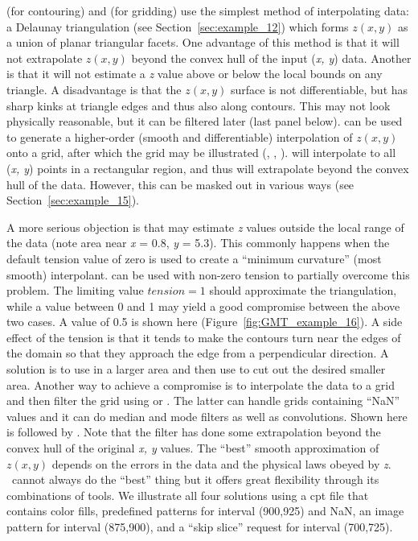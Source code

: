  (for contouring) and 
(for gridding) use the simplest method of interpolating
data:  a Delaunay triangulation (see Section~\ref{sec:example_12}) which
forms $z(x, y)$ as a union of planar triangular facets.
One advantage of this method is that it will not extrapolate
$z(x, y)$ beyond the convex hull of the input ({\it x, y})
data.  Another is that it will not estimate a {\it z} value
above or below the local bounds on any triangle.
A disadvantage is that the $z(x, y)$ surface is not
differentiable, but has sharp kinks at triangle edges and
thus also along contours.  This may not look physically
reasonable, but it can be filtered later (last panel below).
 can be used to generate a higher-order
(smooth and differentiable) interpolation of $z(x, y)$ onto
a grid, after which the grid may be illustrated (,
, ).   will interpolate
to all ({\it x, y}) points in a rectangular region, and thus
will extrapolate beyond the convex hull of the data.  However,
this can be masked out in various ways (see Section~\ref{sec:example_15}).

A more serious objection is that  may estimate
{\it z} values outside the local range of the data (note area
near {\it x} = 0.8, {\it y} = 5.3).  This commonly happens when
the default tension value of zero is used to create a ``minimum
curvature'' (most smooth) interpolant.   can be
used with non-zero tension to partially  overcome this problem.
The limiting value $tension = 1$ should approximate the triangulation,
while a value between 0 and 1 may yield a good compromise between
the above two cases.  A value of 0.5 is shown here
(Figure~\ref{fig:GMT_example_16}).  A side
effect of the tension is that it tends to make the contours turn
near the edges of the domain so that they approach the edge from
a perpendicular direction.  A solution is to use 
in a larger area and then use  to cut out the desired
smaller area.  Another way to achieve a compromise is to
interpolate the data to a grid and then filter the grid using
 or .  The latter can handle grids
containing ``NaN'' values and it can do  median and mode filters
as well as convolutions.  Shown here is  followed
by .  Note that the filter has done some
extrapolation beyond the convex hull of the original {\it x, y}
values.  The ``best'' smooth approximation of $z(x, y)$ depends
on the errors in the data and the physical laws obeyed by {\it z}.
\GMT\ cannot always do the ``best'' thing but it offers great
flexibility through its combinations of tools.  We illustrate all
four solutions using a cpt file that contains color fills,
predefined patterns for interval (900,925) and NaN, an image pattern for interval (875,900),
and a ``skip slice'' request for interval (700,725).

